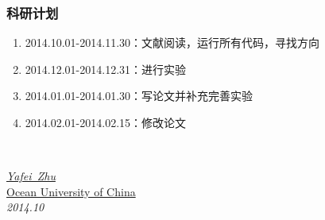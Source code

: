 \documentclass[notheorems,mathserif,table,compress]{beamer}  %
\newcommand\zhushadow[2][purple]{\hskip5pt\shadowbox{\color{#1}\small\kai #2\vspace{3mm}}}
\begin{document}
\begin{frame}
  \frametitle{科研计划}
  \begin{enumerate}
  \item 2014.10.01-2014.11.30：文献阅读，运行所有代码，寻找方向
  \item 2014.12.01-2014.12.31：进行实验
  \item 2014.01.01-2014.01.30：写论文并补充完善实验
  \item 2014.02.01-2014.02.15：修改论文
  \end{enumerate}
\end{frame}


\begin{frame}
  \vspace{2cm}
  \centering
  \zhushadow{\color{blue}\Huge{Thanks}}\\
  \vspace{1.5cm}
  \begin{flushright}
  \emph{\href{mailto:bingzh@ouc.edu.cn}{Yafei~Zhu}}\\
  \href{http://www.ouc.edu.cn}{Ocean University of China}\\
  \emph{2014.10}
  \end{flushright}  
\end{frame}
\end{document}
